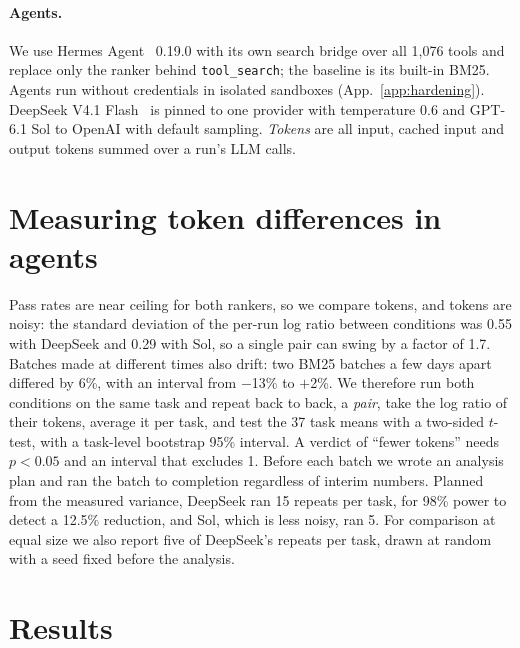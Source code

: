 \documentclass[11pt]{article}
\begin{document}
\paragraph{Agents.} We use Hermes Agent~\citep{hermesagent} 0.19.0 with its own search bridge over all 1{,}076 tools
and replace only the ranker behind \texttt{tool\_search}; the baseline is its built-in BM25. Agents run without
credentials in isolated sandboxes (App.~\ref{app:hardening}). DeepSeek V4.1 Flash~\citep{deepseekv41} is pinned to one
provider with temperature 0.6 and GPT-6.1 Sol to OpenAI with default sampling. \emph{Tokens} are all input, cached
input and output tokens summed over a run's LLM calls.

\section{Measuring token differences in agents}\label{sec:measuring}
Pass rates are near ceiling for both rankers, so we compare tokens, and tokens are noisy: the standard deviation of
the per-run log ratio between conditions was 0.55 with DeepSeek and 0.29 with Sol, so a single pair can swing by a
factor of 1.7. Batches made at different times also drift: two BM25 batches a few days apart differed by 6\%, with an interval from $-$13\% to $+$2\%. We therefore run both conditions on the same task and repeat back to back, a \emph{pair},
take the log ratio of their tokens, average it per task, and test the 37 task means with a two-sided $t$-test, with a
task-level bootstrap 95\% interval. A verdict of ``fewer tokens'' needs $p<0.05$ and an interval that excludes 1.
Before each batch we wrote an analysis plan and ran the batch to completion regardless of interim numbers. Planned
from the measured variance, DeepSeek ran 15 repeats per task, for 98\% power to detect a 12.5\% reduction, and Sol,
which is less noisy, ran 5. For comparison at equal size we also report five of DeepSeek's repeats per task, drawn at
random with a seed fixed before the analysis.

\section{Results}\label{sec:results}
\end{document}
